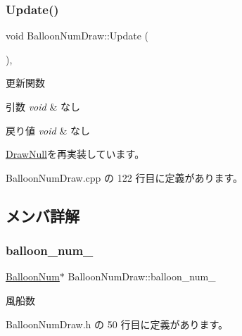 \subsubsection{\texorpdfstring{Update()}{Update()}}
{\footnotesize\ttfamily void Balloon\+Num\+Draw\+::\+Update (\begin{DoxyParamCaption}{ }\end{DoxyParamCaption})\hspace{0.3cm}{\ttfamily [override]}, {\ttfamily [virtual]}}



更新関数 


\begin{DoxyParams}{引数}
{\em void} & なし \\
\hline
\end{DoxyParams}

\begin{DoxyRetVals}{戻り値}
{\em void} & なし \\
\hline
\end{DoxyRetVals}


\mbox{\hyperlink{class_draw_null_ad32a508d269de7eda8ad24ea72230464}{Draw\+Null}}を再実装しています。



 Balloon\+Num\+Draw.\+cpp の 122 行目に定義があります。



\subsection{メンバ詳解}
\mbox{\label{class_balloon_num_draw_afc7a5ff29f69956d1a1f892573c580ca}} 
\subsubsection{\texorpdfstring{balloon\+\_\+num\+\_\+}{balloon\_num\_}}
{\footnotesize\ttfamily \mbox{\hyperlink{class_balloon_num}{Balloon\+Num}}$\ast$ Balloon\+Num\+Draw\+::balloon\+\_\+num\+\_\+\hspace{0.3cm}{\ttfamily [private]}}



風船数 



 Balloon\+Num\+Draw.\+h の 50 行目に定義があります。

